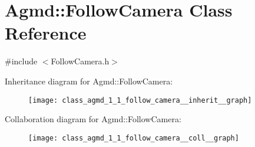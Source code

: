 \hypertarget{class_agmd_1_1_follow_camera}{\section{Agmd\+:\+:Follow\+Camera Class Reference}
\label{class_agmd_1_1_follow_camera}
}


{\ttfamily \#include $<$Follow\+Camera.\+h$>$}



Inheritance diagram for Agmd\+:\+:Follow\+Camera\+:\nopagebreak
\begin{figure}[H]
\begin{center}
\leavevmode
\texttt{[image: class\_agmd\_1\_1\_follow\_camera\_\_inherit\_\_graph]}
\end{center}
\end{figure}


Collaboration diagram for Agmd\+:\+:Follow\+Camera\+:\nopagebreak
\begin{figure}[H]
\begin{center}
\leavevmode
\texttt{[image: class\_agmd\_1\_1\_follow\_camera\_\_coll\_\_graph]}
\end{center}
\end{figure}
